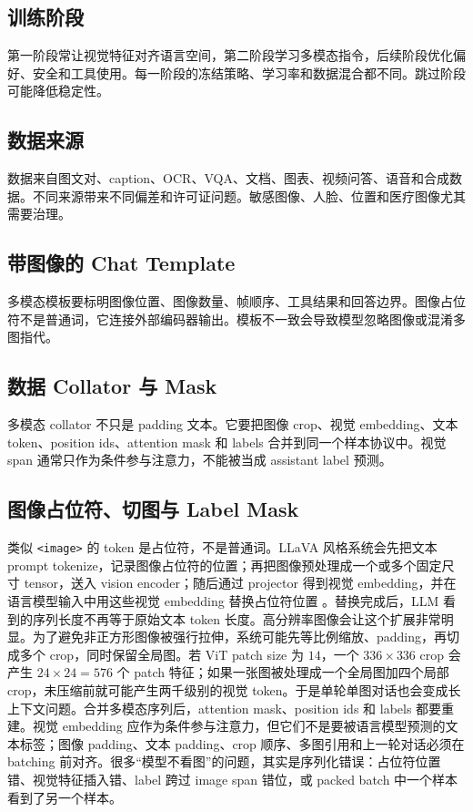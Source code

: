 \documentclass[UTF8,zihao=-4,openany]{ctexbook}
\begin{document}
\subsection{训练阶段}
第一阶段常让视觉特征对齐语言空间，第二阶段学习多模态指令，后续阶段优化偏好、安全和工具使用。每一阶段的冻结策略、学习率和数据混合都不同。跳过阶段可能降低稳定性。

\subsection{数据来源}
数据来自图文对、caption、OCR、VQA、文档、图表、视频问答、语音和合成数据。不同来源带来不同偏差和许可证问题。敏感图像、人脸、位置和医疗图像尤其需要治理。

\subsection{带图像的 Chat Template}
多模态模板要标明图像位置、图像数量、帧顺序、工具结果和回答边界。图像占位符不是普通词，它连接外部编码器输出。模板不一致会导致模型忽略图像或混淆多图指代。

\subsection{数据 Collator 与 Mask}
多模态 collator 不只是 padding 文本。它要把图像 crop、视觉 embedding、文本 token、position ids、attention mask 和 labels 合并到同一个样本协议中。视觉 span 通常只作为条件参与注意力，不能被当成 assistant label 预测。

\subsection{图像占位符、切图与 Label Mask}
类似 \texttt{<image>} 的 token 是占位符，不是普通词。LLaVA 风格系统会先把文本 prompt tokenize，记录图像占位符的位置；再把图像预处理成一个或多个固定尺寸 tensor，送入 vision encoder；随后通过 projector 得到视觉 embedding，并在语言模型输入中用这些视觉 embedding 替换占位符位置 \cite{liu2023visual}。替换完成后，LLM 看到的序列长度不再等于原始文本 token 长度。高分辨率图像会让这个扩展非常明显。为了避免非正方形图像被强行拉伸，系统可能先等比例缩放、padding，再切成多个 crop，同时保留全局图。若 ViT patch size 为 $14$，一个 $336\times336$ crop 会产生 $24\times24=576$ 个 patch 特征；如果一张图被处理成一个全局图加四个局部 crop，未压缩前就可能产生两千级别的视觉 token。于是单轮单图对话也会变成长上下文问题。合并多模态序列后，attention mask、position ids 和 labels 都要重建。视觉 embedding 应作为条件参与注意力，但它们不是要被语言模型预测的文本标签；图像 padding、文本 padding、crop 顺序、多图引用和上一轮对话必须在 batching 前对齐。很多“模型不看图”的问题，其实是序列化错误：占位符位置错、视觉特征插入错、label 跨过 image span 错位，或 packed batch 中一个样本看到了另一个样本。
\end{document}
